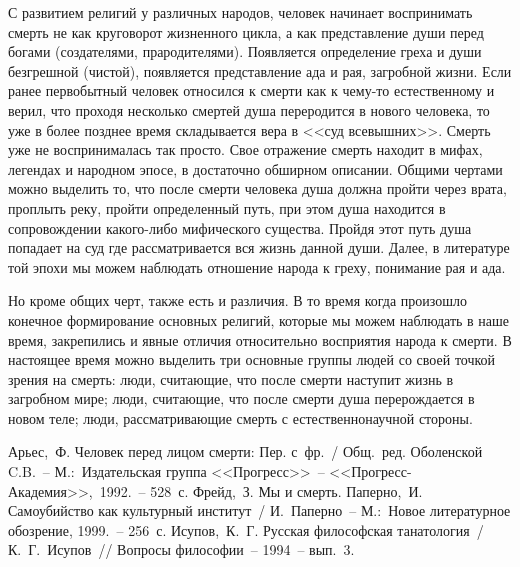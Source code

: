 \documentclass[pscyr,chapters]{hedwork}
\begin{document}
  С развитием религий у различных народов, человек начинает воспринимать смерть
  не как круговорот жизненного цикла, а как представление души перед богами
  (создателями, прародителями). Появляется определение греха и души безгрешной
  (чистой), появляется представление ада и рая, загробной жизни. Если ранее
  первобытный человек относился к смерти как к чему-то естественному и верил,
  что проходя несколько смертей душа переродится в нового человека, то уже в
  более позднее время складывается вера в <<суд всевышних>>. Смерть уже не
  воспринималась так просто. Свое отражение смерть находит в мифах, легендах и
  народном эпосе, в достаточно обширном описании. Общими чертами можно выделить
  то, что после смерти человека душа должна пройти через врата, проплыть реку,
  пройти определенный путь, при этом душа находится в сопровождении какого-либо
  мифического существа. Пройдя этот путь душа попадает на суд где
  рассматривается вся жизнь данной души. Далее, в литературе той эпохи мы можем
  наблюдать отношение народа к греху, понимание рая и ада.

  Но кроме общих черт, также есть и различия. В то время когда произошло
  конечное формирование основных религий, которые мы можем наблюдать в наше
  время, закрепились и явные отличия относительно восприятия народа к смерти. В
  настоящее время можно выделить три основные группы людей со своей точкой
  зрения на смерть: люди, считающие, что после смерти наступит жизнь в
  загробном мире; люди, считающие, что после смерти душа перерождается в
  новом теле; люди, рассматривающие смерть с естественнонаучной стороны.

  \pagebreak

  \renewcommand{\bibname}{Список литературы}
  \begin{thebibliography}{9}
     Арьес,~Ф. Человек перед лицом смерти: Пер. с~фр.~/ Общ.~ред.
      Оболенской C.B.~-- М.:~Издательская группа <<Прогресс>>~--
      <<Прогресс-Академия>>,~1992.~-- 528~с.
     Фрейд,~З. Мы и смерть.
     Паперно,~И. Самоубийство как культурный институт~/ И.~Паперно~--
      М.:~Новое литературное обозрение, 1999.~-- 256~с.
     Исупов,~К.~Г. Русская философская танатология~/ К.~Г.~Исупов~//
      Вопросы философии~-- 1994~-- вып.~3.
  \end{thebibliography}
\end{document}
